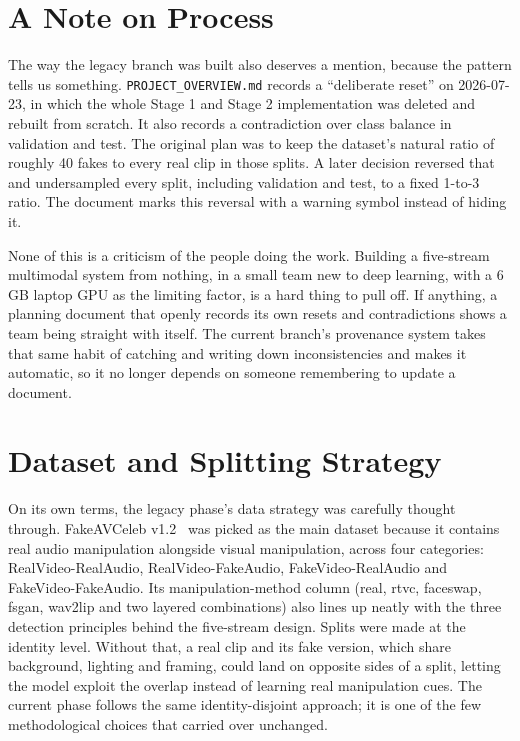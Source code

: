 \section{A Note on Process}

The way the legacy branch was built also deserves a mention, because the
pattern tells us something. \texttt{PROJECT\_OVERVIEW.md} records a
``deliberate reset'' on 2026-07-23, in which the whole Stage 1 and Stage 2
implementation was deleted and rebuilt from scratch. It also records a
contradiction over class balance in validation and test. The original plan was
to keep the dataset's natural ratio of roughly 40 fakes to every real clip in
those splits. A later decision reversed that and undersampled every split,
including validation and test, to a fixed 1-to-3 ratio. The document marks this
reversal with a warning symbol instead of hiding it.

None of this is a criticism of the people doing the work. Building a
five-stream multimodal system from nothing, in a small team new to deep
learning, with a 6 GB laptop GPU as the limiting factor, is a hard thing to
pull off. If anything, a planning document that openly records its own resets
and contradictions shows a team being straight with itself. The current
branch's provenance system takes that same habit of catching and writing down
inconsistencies and makes it automatic, so it no longer depends on someone
remembering to update a document.

\section{Dataset and Splitting Strategy}

On its own terms, the legacy phase's data strategy was carefully thought
through. FakeAVCeleb v1.2~\cite{fakeavceleb} was picked as the main dataset
because it contains real audio manipulation alongside visual manipulation,
across four categories: RealVideo-RealAudio, RealVideo-FakeAudio,
FakeVideo-RealAudio and FakeVideo-FakeAudio. Its manipulation-method column
(real, rtvc, faceswap, fsgan, wav2lip and two layered combinations) also lines
up neatly with the three detection principles behind the five-stream design.
Splits were made at the identity level. Without that, a real clip and its
fake version, which share background, lighting and framing, could land on
opposite sides of a split, letting the model exploit the overlap instead of
learning real manipulation cues. The current phase follows the same
identity-disjoint approach; it is one of the few methodological choices that
carried over unchanged.


